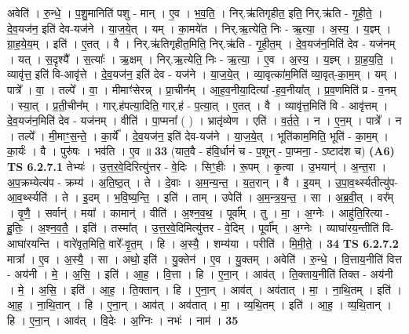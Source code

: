 \documentclass[17pt]{extarticle}
\begin{document}
                  अवेति॑ । रु॒न्धे॒ । प॒शु॒मानिति॑ पशु - मान् । ए॒व । भ॒व॒ति॒ । निर्.ऋ॑तिगृहीत॒ इति॒ निर्.ऋ॑ति - गृ॒ही॒ते॒ । दे॒व॒यज॑न॒ इति॑ देव-यज॑ने । या॒ज॒ये॒त् । यम् । का॒मये॑त । निर्.ऋ॒त्येति॒ निः - ऋ॒त्या॒ । अ॒स्य॒ । य॒ज्ञ्म् । ग्रा॒ह॒ये॒य॒म् । इति॑ । ए॒तत् । वै । निर्.ऋ॑तिगृहीत॒मिति॒ निर्.ऋ॑ति - गृ॒ही॒त॒म् । दे॒व॒यज॑न॒मिति॑ देव - यज॑नम् । यत् । स॒दृश्यै᳚ । स॒त्याः᳚ । ऋ॒क्षम् । निर्.ऋ॒त्येति॒ निः - ऋ॒त्या॒ । ए॒व । अ॒स्य॒ । य॒ज्ञ्म् । ग्रा॒ह॒य॒ति॒ । व्यावृ॑त्त॒ इति॑ वि-आवृ॑त्ते । दे॒व॒यज॑न॒ इति॑ देव - यज॑ने । या॒ज॒ये॒त् । व्या॒वृत्का॑म॒मिति॑ व्या॒वृत्-का॒म॒म् । यम् । पात्रे᳚ । वा॒ । तल्पे᳚ । वा॒ । मीमाꣳ॑सेरन्न् । प्रा॒चीन᳚म् । आ॒ह॒व॒नीया॒दित्या᳚ -ह॒व॒नीया᳚त् । प्र॒व॒णमिति॑ प्र - व॒नम् । स्या॒त् । प्र॒ती॒चीन᳚म् । गार्.ह॑पत्या॒दिति॒ गार्.ह॑ - प॒त्या॒त् । ए॒तत् । वै । व्यावृ॑त्त॒मिति॑ वि - आवृ॑त्तम् । दे॒व॒यज॑न॒मिति॑ देव - यज॑नम् । वीति॑ । पा॒प्मना᳚ ( ) । भ्रातृ॑व्येण । एति॑ । व॒र्त॒ते॒ । न । ए॒न॒म् । पात्रे᳚ । न । तल्पे᳚ । मी॒माꣳ॒॒स॒न्ते॒ । का॒र्ये᳚ । दे॒व॒यज॑न॒ इति॑ देव-यज॑ने । या॒ज॒ये॒त् । भूति॑काम॒मिति॒ भूति॑ - का॒म॒म् । का॒र्यः॑ । वै । पुरु॑षः । भव॑ति । ए॒व ॥ \textbf{  33} \newline
                  \newline
                      (यात॒वै - ह॑वि॒र्धानं॑ च - प॒शून् - पा॒प्मना॒ - ऽष्टाद॑श च)  \textbf{(A6)} \newline \newline
                                \textbf{ TS 6.2.7.1} \newline
                  तेभ्यः॑ । उ॒त्त॒र॒वे॒दिरित्यु॑त्तर - वे॒दिः । सिꣳ॒॒हीः । रू॒पम् । कृ॒त्वा । उ॒भयान्॑ । अ॒न्त॒रा । अ॒प॒क्रम्येत्य॑प - क्रम्य॑ । अ॒ति॒ष्ठ॒त् । ते । दे॒वाः । अ॒म॒न्य॒न्त॒ । य॒त॒रान् । वै । इ॒यम् । उ॒पा॒व॒र्थ्स्यतीत्यु॑प-आ॒व॒र्थ्स्यति॑ । ते । इ॒दम् । भ॒वि॒ष्य॒न्ति॒ । इति॑ । ताम् । उपेति॑ । अ॒म॒न्त्र॒य॒न्त॒ । सा । अ॒ब्र॒वी॒त् । वर᳚म् । वृ॒णै॒ । सर्वान्॑ । मया᳚ । कामान्॑ । वीति॑ । अ॒श्न॒व॒थ॒ । पूर्वा᳚म् । तु । मा॒ । अ॒ग्नेः । आहु॑ति॒रित्या - हु॒तिः॒ । अ॒श्न॒व॒तै॒ । इति॑ । तस्मा᳚त् । उ॒त्त॒र॒वे॒दिमित्यु॑त्तर - वे॒दिम् । पूर्वा᳚म् । अ॒ग्नेः । व्याघा॑रय॒न्तीति॑ वि-आघा॑रयन्ति । वारे॑वृत॒मिति॒ वारे᳚-वृ॒त॒म् । हि । अ॒स्यै॒ । शम्य॑या । परीति॑ । मि॒मी॒ते॒ । \textbf{  34} \newline
                  \newline
                                \textbf{ TS 6.2.7.2} \newline
                  मात्रा᳚ । ए॒व । अ॒स्यै॒ । सा । अथो॒ इति॑ । यु॒क्तेन॑ । ए॒व । यु॒क्तम् । अवेति॑ । रु॒न्धे॒ । वि॒त्ताय॒नीति॑ वित्त - अय॑नी । मे॒ । अ॒सि॒ । इति॑ । आ॒ह॒ । वि॒त्ता । हि । ए॒ना॒न् । आव॑त् । ति॒क्ताय॒नीति॑ तिक्त - अय॑नी । मे॒ । अ॒सि॒ । इति॑ । आ॒ह॒ । ति॒क्तान् । हि । ए॒ना॒न् । आव॑त् । अव॑तात् । मा॒ । ना॒थि॒तम् । इति॑ । आ॒ह॒ । ना॒थि॒तान् । हि । ए॒ना॒न् । आव॑त् । अव॑तात् । मा॒ । व्य॒थि॒तम् । इति॑ । आ॒ह॒ । व्य॒थि॒तान् । हि । ए॒ना॒न् । आव॑त् । वि॒देः । अ॒ग्निः । नभः॑ । नाम॑ । \textbf{  35} \newline
\end{document}
